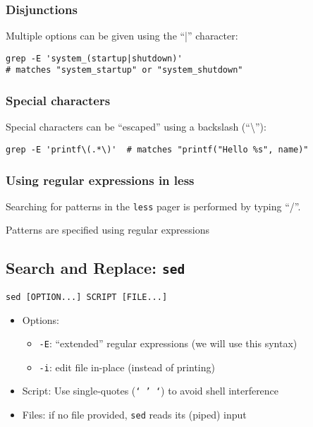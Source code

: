 \documentclass[12pt]{article}
\begin{document}
\subsubsection{Disjunctions}

Multiple options can be given using the ``|'' character:

\begin{lstlisting}
grep -E 'system_(startup|shutdown)' 
# matches "system_startup" or "system_shutdown"
\end{lstlisting}

\subsubsection{Special characters}

Special characters can be “escaped” using a backslash (“\textbackslash”):

\begin{lstlisting}
grep -E 'printf\(.*\)'  # matches "printf("Hello %s", name)"
\end{lstlisting}

\subsubsection{Using regular expressions in less}

Searching for patterns in the \texttt{less} pager is performed by typing ``/''. 

Patterns are specified using regular expressions

\subsection{Search and Replace: \texttt{sed}}

\texttt{sed [OPTION...] SCRIPT [FILE...]}

\begin{itemize}
    \item Options:
    \begin{itemize}
        \item \texttt{-E}: ``extended'' regular expressions (we will use this syntax)
        \item \texttt{-i}: edit file in-place (instead of printing)
    \end{itemize}
    \item Script: Use single-quotes (\texttt{` ' `}) to avoid shell interference
    \item Files: if no file provided, \texttt{sed} reads its (piped) input
\end{itemize}
\end{document}
